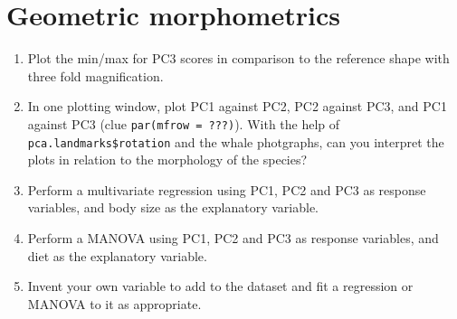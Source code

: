 \documentclass[]{book}
\providecommand{\tightlist}{%
  \setlength{\itemsep}{0pt}\setlength{\parskip}{0pt}}
\theoremstyle{definition}
\theoremstyle{definition}
\theoremstyle{definition}
\theoremstyle{remark}
\begin{document}
\section{Geometric morphometrics}\label{geometric-morphometrics}

\begin{enumerate}
\def\labelenumi{\arabic{enumi}.}
\tightlist
\item
  Plot the min/max for PC3 scores in comparison to the reference shape
  with three fold magnification.
\item
  In one plotting window, plot PC1 against PC2, PC2 against PC3, and PC1
  against PC3 (clue \texttt{par(mfrow\ =\ ???)}). With the help of
  \texttt{pca.landmarks\$rotation} and the whale photgraphs, can you
  interpret the plots in relation to the morphology of the species?
\item
  Perform a multivariate regression using PC1, PC2 and PC3 as response
  variables, and body size as the explanatory variable.
\item
  Perform a MANOVA using PC1, PC2 and PC3 as response variables, and
  diet as the explanatory variable.
\item
  Invent your own variable to add to the dataset and fit a regression or
  MANOVA to it as appropriate.
\end{enumerate}
\end{document}
